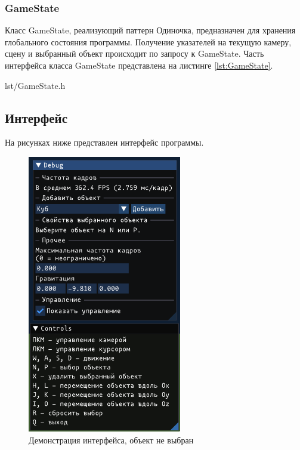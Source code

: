 \subsubsection*{GameState}

Класс GameState, реализующий паттерн Одиночка, предназначен для хранения глобального состояния программы.
Получение указателей на текущую камеру, сцену и выбранный объект происходит по запросу к GameState.
Часть интерфейса класса GameState представлена на листинге \ref{lst:GameState}.

\begin{code}
    \begin{lstinputlisting}[
            label={lst:GameState},
            caption={Класс GameState},
        ]{lst/GameState.h}
    \end{lstinputlisting}
\end{code}

\subsection{Интерфейс}

На рисунках ниже представлен интерфейс программы.

\begin{figure}[H]
	\centering
	\includegraphics[width=0.6\textwidth]{img/demo-icontrols.png}
	\caption{Демонстрация интерфейса, объект не выбран}
	\label{fig:controls}
\end{figure}

